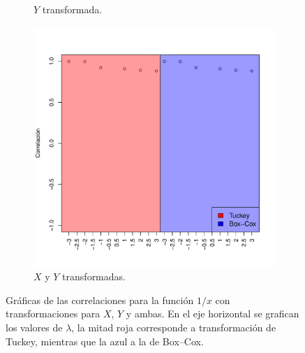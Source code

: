 \documentclass[paper=leter, fontsize=11pt]{scrartcl}
\numberwithin{equation}{section}		%
\numberwithin{figure}{section}			%
\numberwithin{table}{section}				%
\begin{document}
\begin{figure}
\begin{subfigure}{0.5\textwidth}
        \caption{$Y$ transformada.}
        \label{yTcorr3}
    \end{subfigure}
    \begin{subfigure}{1\textwidth}
        \centering
        \includegraphics[scale=0.4]{xT_yTcorr3.pdf}
        \caption{$X$ y $Y$ transformadas.}
        \label{yTcorr3}
    \end{subfigure}
    \caption{Gráficas de las correlaciones para la función $1/x$ con transformaciones para $X$, $Y$ y ambas. En el eje horizontal se grafican los valores de $\lambda$, la mitad roja corresponde a transformación de Tuckey, mientras que la azul a la de Box--Cox.}
    \label{corr3}
\end{figure}



\end{document}
